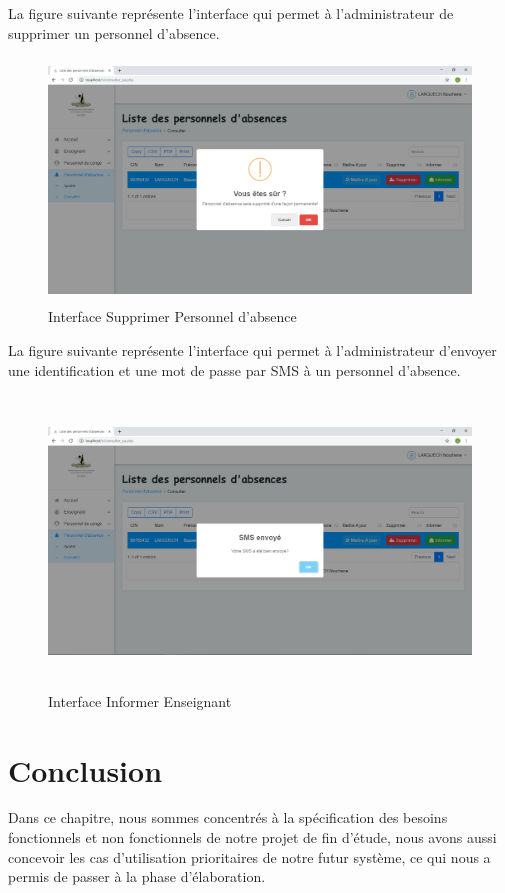 \documentclass[12 pt ]{report}
\begin{document}
La figure suivante représente l'interface qui permet à l'administrateur de supprimer un personnel d'absence.
\begin{figure}[h]
 \begin{center}
\includegraphics[width= 16 cm ,height= 6.5cm]{supprimer_pa.PNG}
\caption{Interface Supprimer Personnel d'absence}

\end{center}
\end{figure}
\newpage
 La figure suivante représente l'interface qui permet à l'administrateur d'envoyer une identification et une mot de passe par SMS à un personnel d'absence.
\begin{figure}[h]
 \begin{center}
\includegraphics[width= 18 cm ,height=  7.75cm]{informer_pa.PNG}
\caption{Interface 	Informer Enseignant}

\end{center}
\end{figure}
\section*{Conclusion}  
Dans ce chapitre, nous sommes concentrés à la spécification des besoins fonctionnels et non fonctionnels de notre projet de fin d’étude, nous avons aussi concevoir les cas d’utilisation prioritaires de notre futur système, ce qui nous a permis de passer à la phase d’élaboration.
\end{document}
